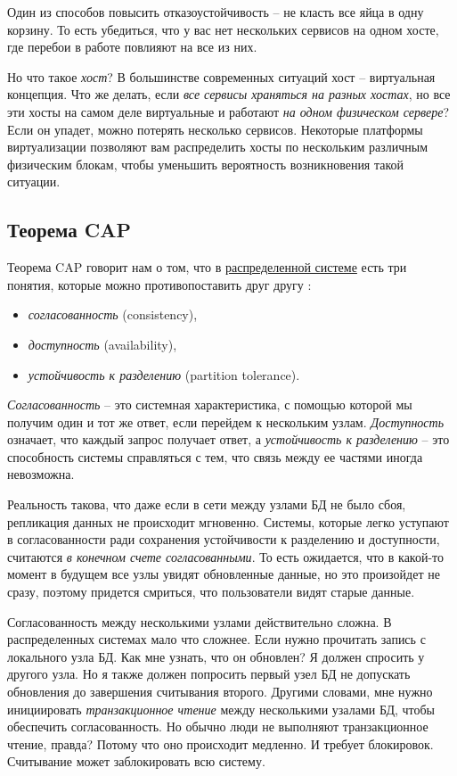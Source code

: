 \documentclass[%
	11pt,
	a4paper,
	utf8,
		]{article}
\begin{document}
Один из способов повысить отказоустойчивость -- не класть все яйца в одну корзину. То есть убедиться, что у вас нет нескольких сервисов на одном хосте, где перебои в работе повлияют на все из них.

Но что такое \emph{хост}? В большинстве современных ситуаций хост -- виртуальная концепция. Что же делать, если \emph{все сервисы храняться на разных хостах}, но все эти хосты на самом деле виртуальные и работают \emph{на одном физическом сервере}? Если он упадет, можно потерять несколько сервисов. Некоторые платформы виртуализации позволяют вам распределить хосты по нескольким различным физическим блокам, чтобы уменьшить вероятность возникновения такой ситуации.

\subsection{Теорема CAP}

Теорема CAP говорит нам о том, что в \underline{распределенной системе} есть три понятия, которые можно противопоставить друг другу \cite[]{microservices-2024}: 
\begin{itemize}
	\item \emph{согласованность} (consistency),
	
	\item \emph{доступность} (availability),
	
	\item \emph{устойчивость к разделению} (partition tolerance).
\end{itemize}

\emph{Согласованность} -- это системная характеристика, с помощью которой мы получим один и тот же ответ, если перейдем к нескольким узлам. \emph{Доступность} означает, что каждый запрос получает ответ, а \emph{устойчивость к разделению} -- это способность системы справляться с тем, что связь между ее частями иногда невозможна.

Реальность такова, что даже если в сети между узлами БД не было сбоя, репликация данных не происходит мгновенно. Системы, которые легко уступают в согласованности ради сохранения устойчивости к разделению и доступности, считаются \emph{в конечном счете согласованными}. То есть ожидается, что в какой-то момент в будущем все узлы увидят обновленные данные, но это произойдет не сразу, поэтому придется смриться, что пользователи видят старые данные.

Согласованность между несколькими узлами действительно сложна. В распределенных системах мало что сложнее. Если нужно прочитать запись с локального узла БД. Как мне узнать, что он обновлен? Я должен спросить у другого узла. Но я также должен попросить первый узел БД не допускать обновления до завершения считывания второго. Другими словами, мне нужно инициировать \emph{транзакционное чтение} между несколькими узалами БД, чтобы обеспечить согласованность. Но обычно люди не выполняют транзакционное чтение, правда? Потому что оно происходит медленно. И требует блокировок. Считывание может заблокировать всю систему.
\end{document}
